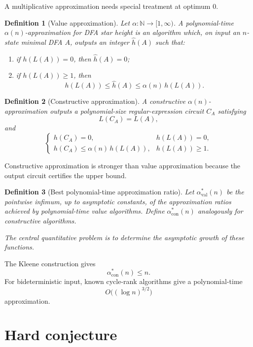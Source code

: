 \documentclass[11pt]{article}
\newtheorem{definition}{Definition}
\begin{document}
A multiplicative approximation needs special treatment at optimum $0$.

\begin{definition}[Value approximation]
Let $\alpha:\mathbb N\to[1,\infty)$. A polynomial-time
$\alpha(n)$-approximation for DFA star height is an algorithm which, on input
an $n$-state minimal DFA $A$, outputs an integer $\widehat h(A)$ such that:
\begin{enumerate}[label=(\roman*)]
  \item if $h(L(A))=0$, then $\widehat h(A)=0$;
  \item if $h(L(A))\geq1$, then
  \[
    h(L(A))
    \leq \widehat h(A)
    \leq \alpha(n)\,h(L(A)).
  \]
\end{enumerate}
\end{definition}

\begin{definition}[Constructive approximation]
A constructive $\alpha(n)$-approximation outputs a polynomial-size
regular-expression circuit $C_A$ satisfying
\[
 L(C_A)=L(A),
\]
and
\[
\begin{cases}
h(C_A)=0,&h(L(A))=0,\\[2mm]
h(C_A)\leq\alpha(n)\,h(L(A)),&h(L(A))\geq1.
\end{cases}
\]
\end{definition}

Constructive approximation is stronger than value approximation because the
output circuit certifies the upper bound.

\begin{definition}[Best polynomial-time approximation ratio]
Let $\alpha_{\mathrm{val}}^*(n)$ be the pointwise infimum, up to asymptotic
constants, of the approximation ratios achieved by polynomial-time value
algorithms. Define $\alpha_{\mathrm{con}}^*(n)$ analogously for constructive
algorithms.

The central quantitative problem is to determine the asymptotic growth of
these functions.
\end{definition}

The Kleene construction gives
\[
 \alpha_{\mathrm{con}}^*(n)\leq n.
\]
For bideterministic input, known cycle-rank algorithms give a polynomial-time
\[
 O\bigl((\log n)^{3/2}\bigr)
\]
approximation.

\section{Hard conjecture}
\end{document}
